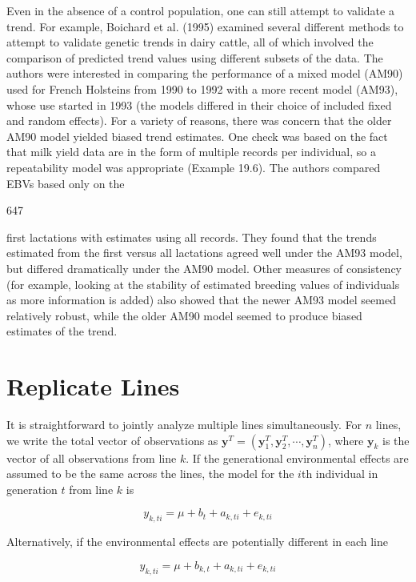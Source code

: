 \documentclass{article}
\begin{document}
Even in the absence of a control population, one can still attempt to validate a trend. For example, Boichard et al. (1995) examined several different methods to attempt to validate genetic trends in dairy cattle, all of which involved the comparison of predicted trend values using different subsets of the data. The authors were interested in comparing the performance of a mixed model (AM90) used for French Holsteins from 1990 to 1992 with a more recent model (AM93), whose use started in 1993 (the models differed in their choice of included fixed and random effects). For a variety of reasons, there was concern that the older AM90 model yielded biased trend estimates. One check was based on the fact that milk yield data are in the form of multiple records per individual, so a repeatability model was appropriate (Example 19.6). The authors compared EBVs based only on the

647

first lactations with estimates using all records. They found that the trends estimated from the first versus all lactations agreed well under the AM93 model, but differed dramatically under the AM90 model. Other measures of consistency (for example, looking at the stability of estimated breeding values of individuals as more information is added) also showed that the newer AM93 model seemed relatively robust, while the older AM90 model seemed to produce biased estimates of the trend.

\section{Replicate Lines}
It is straightforward to jointly analyze multiple lines simultaneously. For $n$ lines, we write the total vector of observations as $\mathbf{y}^T = (\mathbf{y}_1^T, \mathbf{y}_2^T, \cdots, \mathbf{y}_n^T)$, where $\mathbf{y}_k$ is the vector of all observations from line $k$. If the generational environmental effects are assumed to be the same across the lines, the model for the $i$th individual in generation $t$ from line $k$ is

\begin{equation}
y_{k,ti}=\mu+b_{t}+a_{k,ti}+e_{k,ti}
\tag{19.12a}
\label{eq:19_12a}
\end{equation}

Alternatively, if the environmental effects are potentially different in each line

\begin{equation}
y_{k,ti}=\mu+b_{k,t}+a_{k,ti}+e_{k,ti}
\tag{19.12b}
\label{eq:19_12b}
\end{equation}
\end{document}
